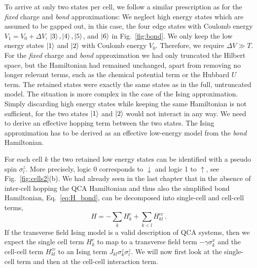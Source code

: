 To arrive at only two states per cell, we follow a similar prescription as for
the \emph{fixed} charge and \emph{bond} approximations: We neglect high energy
states which are assumed to be gapped out, in this case, the four edge states
with Coulomb energy $V_1 = V_0 + \Delta V$, $\left|3\right>, \left|4\right>, \left|5\right>$, and
$\left|6\right>$ in Fig.~\ref{fig:bond}. We only keep the low energy states $\left|1\right>$
and $\left|2\right>$ with Coulomb energy $V_0$. Therefore, we require $\Delta V \gg T$.
For the \emph{fixed} charge and \emph{bond} approximation we had only truncated
the Hilbert space, but the Hamiltonian had remained unchanged, apart from
removing no longer relevant terms, such as the chemical potential term or the
Hubbard $U$ term. The retained states were exactly the same states as in the
full, untruncated model. The situation is more complex in the case of the Ising
approximation. Simply discarding high energy states while keeping the same
Hamiltonian is not sufficient, for the two states $\left|1\right>$ and $\left|2\right>$ would
not interact in any way. We need to derive an effective hopping term between the
two states. The Ising approximation has to be derived as an effective low-energy
model from the \emph{bond} Hamiltonian.

For each cell $k$ the two retained low energy states can be identified with a
pseudo spin $\sigma^z_l$. More precisely, logic 0 corresponds to $\downarrow$
and logic 1 to $\uparrow$, see Fig.~\ref{fig:cells2}(b). We had already seen in
the last chapter that in the absence of inter-cell hopping the QCA Hamiltonian
and thus also the simplified bond Hamiltonian, Eq.~\ref{eq:H_bond}, can be
decomposed into single-cell and cell-cell terms,
\begin{equation}
  \label{eq:H_cell_}
  H = - \sum_k H^c_k + \sum_{k<l} H^{cc}_{kl} \, .
\end{equation}
If the transverse field Ising model is a valid description of QCA systems, then
we expect the single cell term $H^c_k$ to map to a transverse field term
$-\gamma \sigma^x_k$ and the cell-cell term $H^{cc}_{kl}$ to an Ising term
$J_{kl} \sigma^z_k \sigma^z_l$. We will now first look at the single-cell term
and then at the cell-cell interaction term.

